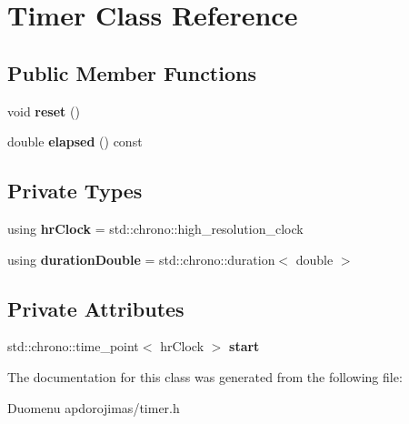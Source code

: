 \hypertarget{class_timer}{}\section{Timer Class Reference}
\label{class_timer}
\subsection*{Public Member Functions}
\begin{DoxyCompactItemize}
\item 
\mbox{\label{class_timer_a9020542d73357a4eef512eefaf57524b}} 
void {\bfseries reset} ()
\item 
\mbox{\label{class_timer_a6a89a613c2af9b0d1e5f7e4ba9e46c54}} 
double {\bfseries elapsed} () const
\end{DoxyCompactItemize}
\subsection*{Private Types}
\begin{DoxyCompactItemize}
\item 
\mbox{\label{class_timer_a5e72191005a6b2238ed91c3839374093}} 
using {\bfseries hr\+Clock} = std\+::chrono\+::high\+\_\+resolution\+\_\+clock
\item 
\mbox{\label{class_timer_a0774383e69e89a22ea605e6841d1eaca}} 
using {\bfseries duration\+Double} = std\+::chrono\+::duration$<$ double $>$
\end{DoxyCompactItemize}
\subsection*{Private Attributes}
\begin{DoxyCompactItemize}
\item 
\mbox{\label{class_timer_ad3c6240154d9bcccb88b701849919822}} 
std\+::chrono\+::time\+\_\+point$<$ hr\+Clock $>$ {\bfseries start}
\end{DoxyCompactItemize}


The documentation for this class was generated from the following file\+:\begin{DoxyCompactItemize}
\item 
Duomenu apdorojimas/timer.\+h\end{DoxyCompactItemize}
